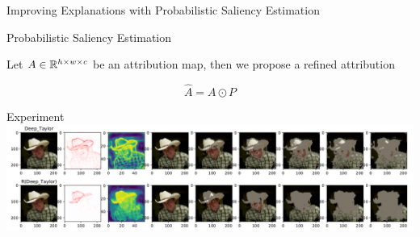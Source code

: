 \begin{frame}[standout]
	Improving Explanations with Probabilistic Saliency Estimation
\end{frame}

\begin{frame}{Probabilistic Saliency Estimation~\cite{pse}}
	\begin{center}
		\scalebox{0.55}{
			
		}
	\end{center}
	
	Let $A \in \mathbb{R}^{h \times w \times c}$ be an attribution map,
	then we propose a refined attribution 

	$$
		\hat A = A \odot P
	$$
\end{frame}

\begin{frame}{Experiment}
	\includegraphics[width=\textwidth]{PSE_example.png}
\end{frame}
